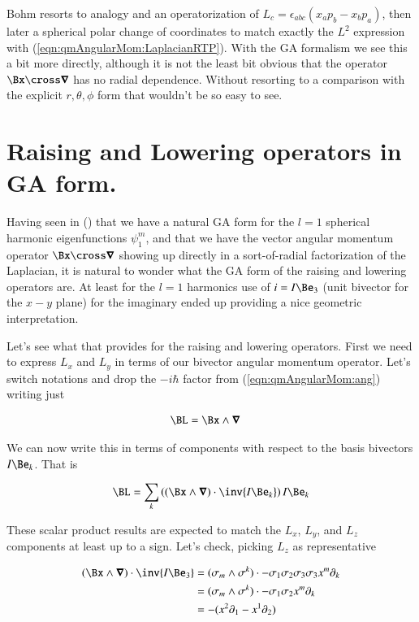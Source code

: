 Bohm resorts to analogy and an operatorization of $L_c = \epsilon_{abc} (x_a p_b - x_b p_a)$, then later a spherical polar change of coordinates to match exactly the $L^2$ expression with (\ref{eqn:qmAngularMom:LaplacianRTP}).  With the GA formalism we see this a bit more directly, although it is not the least bit obvious that the operator $\Bx \cross \spacegrad$ has no radial dependence.  Without resorting to a comparison with the explicit $r,\theta,\phi$ form that wouldn't be so easy to see.

\section{Raising and Lowering operators in GA form.}

Having seen in () that we have a natural GA form for the $l=1$ spherical harmonic eigenfunctions $\psi_1^{m}$, and that we have the vector angular momentum operator $\Bx \cross \spacegrad$ showing up directly in a sort-of-radial factorization of the Laplacian, it is natural to wonder what the GA form of the raising and lowering operators are.  At least for the $l=1$ harmonics use of $i = I \Be_3$ (unit bivector for the $x-y$ plane) for the imaginary ended up providing a nice geometric interpretation.

Let's see what that provides for the raising and lowering operators.  First we need to express $L_x$ and $L_y$ in terms of our bivector angular momentum operator.  Let's switch notations and drop the $-i \hbar$ factor from (\ref{eqn:qmAngularMom:ang}) writing just

\begin{align}\label{eqn:qmAngularMom:Ang}
\BL &= \Bx \wedge \spacegrad
\end{align}

We can now write this in terms of components with respect to the basis bivectors $I \Be_k$.  That is

\begin{align}\label{eqn:qmAngularMom:BLprojected}
\BL = \sum_k \left( (\Bx \wedge \spacegrad) \cdot \inv{I \Be_k}\right) I \Be_k
\end{align}

These scalar product results are expected to match the $L_x$, $L_y$, and $L_z$ components at least up to a sign.  Let's check, picking $L_z$ as representative

\begin{align*}
(\Bx \wedge \spacegrad) \cdot \inv{I \Be_3}
&=
(\sigma_m \wedge \sigma^k) \cdot {-\sigma_1 \sigma_2 \sigma_3 \sigma_3} x^m \partial_k \\
&=
(\sigma_m \wedge \sigma^k) \cdot {-\sigma_1 \sigma_2} x^m \partial_k \\
&=
-( x^2 \partial_1 - x^1 \partial_2 )
\end{align*}


